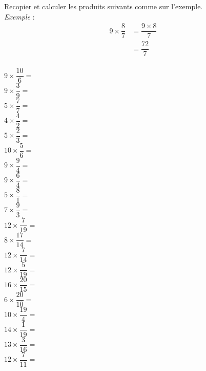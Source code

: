 \begin{multicols}{2}
Recopier et calculer les produits suivants comme sur l'exemple. \\
\textit{Exemple} : \columnbreak
\begin{align*}
9\times \dfrac{8}{7}&= \dfrac{ 9\times8}{7}\\
                    &=\dfrac{72}{7}\\
\end{align*}
\end{multicols}
\begin{multicols}{4} \setlength{\columnseprule}{0.5pt}
    $9\times \dfrac{10}{6}=$ \dotfill \\ \vskip 0.3cm
$9\times \dfrac{3}{9}=$ \dotfill \\ \vskip 0.3cm $5\times
\dfrac{7}{7}=$ \dotfill \\ \vskip 0.3cm $4\times \dfrac{4}{2}=$
\dotfill \\ \vskip 0.3cm $5\times \dfrac{2}{3}=$ \dotfill \\
\vskip 0.3cm $10\times \dfrac{5}{6}=$ \dotfill \\ \vskip 0.3cm
$9\times \dfrac{9}{4}=$ \dotfill \\ \vskip 0.3cm $9\times
\dfrac{6}{4}=$ \dotfill \\ \vskip 0.3cm $5\times \dfrac{8}{1}=$
\dotfill \\ \vskip 0.3cm $7\times \dfrac{9}{3}=$ \dotfill \\
\vskip 0.3cm $12\times \dfrac{7}{19}=$ \dotfill \\ \vskip 0.3cm
$8\times \dfrac{17}{14}=$ \dotfill \\ \vskip 0.3cm $12\times
\dfrac{7}{14}=$ \dotfill \\ \vskip 0.3cm $12\times \dfrac{5}{19}=$
\dotfill \\ \vskip 0.3cm $16\times \dfrac{20}{15}=$ \dotfill \\
\vskip 0.3cm $6\times \dfrac{20}{10}=$ \dotfill \\ \vskip 0.3cm
$10\times \dfrac{19}{4}=$ \dotfill \\ \vskip 0.3cm $14\times
\dfrac{1}{19}=$ \dotfill \\ \vskip 0.3cm $13\times \dfrac{3}{16}=$
\dotfill \\ \vskip 0.3cm $12\times \dfrac{7}{11}=$ \dotfill \\
\vskip 0.3cm
\end{multicols}
\setlength{\columnseprule}{0pt}